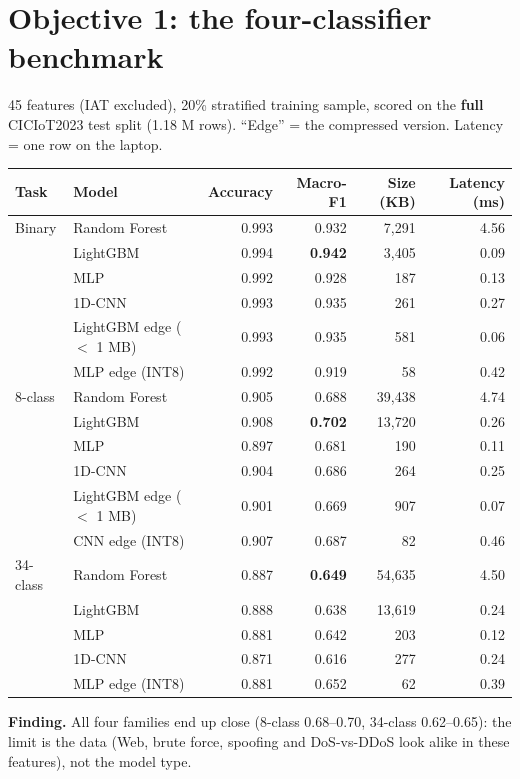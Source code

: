 \documentclass[11pt,a4paper]{article}
\begin{document}
\section{Objective 1: the four-classifier benchmark}

45 features (IAT excluded), 20\% stratified training sample, scored on the \textbf{full} CICIoT2023 test split
(1.18 M rows). ``Edge'' = the compressed version. Latency = one row on the laptop.

\begin{longtable}{llrrrr}
\toprule
Task & Model & Accuracy & Macro-F1 & Size (KB) & Latency (ms) \\
\midrule
\endhead
Binary & Random Forest & 0.993 & 0.932 & 7,291 & 4.56 \\
& LightGBM & 0.994 & \textbf{0.942} & 3,405 & 0.09 \\
& MLP & 0.992 & 0.928 & 187 & 0.13 \\
& 1D-CNN & 0.993 & 0.935 & 261 & 0.27 \\
& LightGBM edge ($<$ 1 MB) & 0.993 & 0.935 & 581 & 0.06 \\
& MLP edge (INT8) & 0.992 & 0.919 & 58 & 0.42 \\
\midrule
8-class & Random Forest & 0.905 & 0.688 & 39,438 & 4.74 \\
& LightGBM & 0.908 & \textbf{0.702} & 13,720 & 0.26 \\
& MLP & 0.897 & 0.681 & 190 & 0.11 \\
& 1D-CNN & 0.904 & 0.686 & 264 & 0.25 \\
& LightGBM edge ($<$ 1 MB) & 0.901 & 0.669 & 907 & 0.07 \\
& CNN edge (INT8) & 0.907 & 0.687 & 82 & 0.46 \\
\midrule
34-class & Random Forest & 0.887 & \textbf{0.649} & 54,635 & 4.50 \\
& LightGBM & 0.888 & 0.638 & 13,619 & 0.24 \\
& MLP & 0.881 & 0.642 & 203 & 0.12 \\
& 1D-CNN & 0.871 & 0.616 & 277 & 0.24 \\
& MLP edge (INT8) & 0.881 & 0.652 & 62 & 0.39 \\
\bottomrule
\end{longtable}

\textbf{Finding.} All four families end up close (8-class 0.68--0.70, 34-class 0.62--0.65): the limit is the data
(Web, brute force, spoofing and DoS-vs-DDoS look alike in these features), not the model type.
\end{document}

